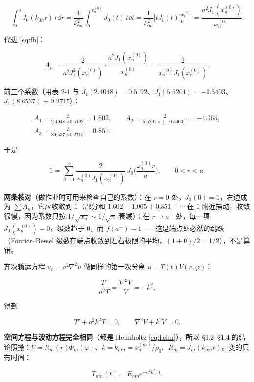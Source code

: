 \documentclass[11pt]{ctexart}
\let\origsubhdr\subhdr
\renewcommand{\subhdr}[1]{\par\needspace{3\baselineskip}\origsubhdr{#1}}
\let\orighdr\hdr
\renewcommand{\hdr}[2]{\par\needspace{6\baselineskip}\orighdr{#1}{#2}}
\begin{document}
\[
\int_0^aJ_0(k_{0n}r)\,r\dd r
=\frac1{k_{0n}^2}\int_0^{x_n^{(0)}}J_0(t)\,t\dd t
=\frac1{k_{0n}^2}\Big[tJ_1(t)\Big]_0^{x_n^{(0)}}
=\frac{a^2J_1(x_n^{(0)})}{x_n^{(0)}} .
\]

代进 \eqref{eq:fb}：

\[
A_n=\frac{2}{a^2J_1^2(x_n^{(0)})}\cdot\frac{a^2J_1(x_n^{(0)})}{x_n^{(0)}}=\frac{2}{x_n^{(0)}J_1(x_n^{(0)})}.
\]

前三个系数（用表 2-1 与 $J_1(2.4048)=0.5192$、$J_1(5.5201)=-0.3403$、$J_1(8.6537)=0.2715$）：

\begin{gather*}
A_1=\frac{2}{2.4048\times0.5192}=1.602,\qquad
A_2=\frac{2}{5.5201\times(-0.3403)}=-1.065,\\
A_3=\frac{2}{8.6537\times0.2715}=0.851 .
\end{gather*}

于是

\[
1=\sum_{n=1}^{\infty}\frac{2}{x_n^{(0)}J_1(x_n^{(0)})}\,J_0\Big(\frac{x_n^{(0)}r}{a}\Big),\qquad 0<r<a .
\]

\textbf{两条核对}（做作业时可用来检查自己的系数）：在 $r=0$ 处，$J_0(0)=1$，右边成为 $\sum A_n$，它应收敛到 $1$（部分和 $1.602-1.065+0.851-\cdots$ 在 $1$ 附近摆动，收敛很慢，因为系数只按 $1/\sqrt{x_n}\sim1/\sqrt n$ 衰减）；在 $r\to a^-$ 处，每一项 $J_0(x_n^{(0)})=0$，级数趋于 $0$，而 $f(a^-)=1$——这是端点处必然的跳跃（Fourier--Bessel 级数在端点收敛到左右极限的平均，$(1+0)/2=1/2$），不是算错。

\label{sec:s3}


齐次输运方程 $u_t=a^2\nabla^2u$ 做同样的第一次分离 $u=T(t)V(r,\varphi)$：

\[
\frac{T'}{a^2T}=\frac{\nabla^2V}{V}=-k^2 ,
\]

得到

\begin{equation}
T'+a^2k^2T=0,
\qquad
\nabla^2V+k^2V=0 .
\label{eq:transport}
\end{equation}

\textbf{空间方程与波动方程完全相同}（都是 Helmholtz \eqref{eq:helm}），所以 \S1.2--\S1.4 的结论照搬：$V=R_m(r)\Phi_m(\varphi)$、$k=k_{mn}=x_n^{(m)}/\rho_0$、$R_m=J_m(k_{mn}r)$。变的只有时间：

\[
T_{mn}(t)=E_{mn}e^{-a^2k_{mn}^2t}.
\]
\end{document}
